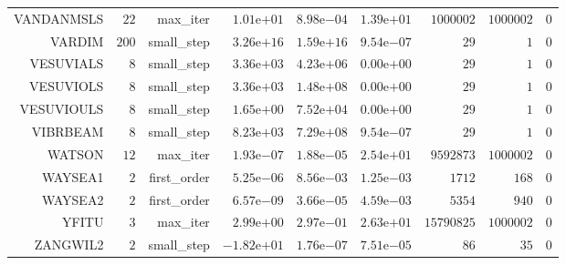 \begin{longtable}{rrrrrrrrr}
VANDANMSLS & \(    22\) & max\_iter & \( 1.01\)e\(+01\) & \( 8.98\)e\(-04\) & \( 1.39\)e\(+01\) & \(1000002\) & \(1000002\) & \(     0\) \\
VARDIM & \(   200\) & small\_step & \( 3.26\)e\(+16\) & \( 1.59\)e\(+16\) & \( 9.54\)e\(-07\) & \(    29\) & \(     1\) & \(     0\) \\
VESUVIALS & \(     8\) & small\_step & \( 3.36\)e\(+03\) & \( 4.23\)e\(+06\) & \( 0.00\)e\(+00\) & \(    29\) & \(     1\) & \(     0\) \\
VESUVIOLS & \(     8\) & small\_step & \( 3.36\)e\(+03\) & \( 1.48\)e\(+08\) & \( 0.00\)e\(+00\) & \(    29\) & \(     1\) & \(     0\) \\
VESUVIOULS & \(     8\) & small\_step & \( 1.65\)e\(+00\) & \( 7.52\)e\(+04\) & \( 0.00\)e\(+00\) & \(    29\) & \(     1\) & \(     0\) \\
VIBRBEAM & \(     8\) & small\_step & \( 8.23\)e\(+03\) & \( 7.29\)e\(+08\) & \( 9.54\)e\(-07\) & \(    29\) & \(     1\) & \(     0\) \\
WATSON & \(    12\) & max\_iter & \( 1.93\)e\(-07\) & \( 1.88\)e\(-05\) & \( 2.54\)e\(+01\) & \(9592873\) & \(1000002\) & \(     0\) \\
WAYSEA1 & \(     2\) & first\_order & \( 5.25\)e\(-06\) & \( 8.56\)e\(-03\) & \( 1.25\)e\(-03\) & \(  1712\) & \(   168\) & \(     0\) \\
WAYSEA2 & \(     2\) & first\_order & \( 6.57\)e\(-09\) & \( 3.66\)e\(-05\) & \( 4.59\)e\(-03\) & \(  5354\) & \(   940\) & \(     0\) \\
YFITU & \(     3\) & max\_iter & \( 2.99\)e\(+00\) & \( 2.97\)e\(-01\) & \( 2.63\)e\(+01\) & \(15790825\) & \(1000002\) & \(     0\) \\
ZANGWIL2 & \(     2\) & small\_step & \(-1.82\)e\(+01\) & \( 1.76\)e\(-07\) & \( 7.51\)e\(-05\) & \(    86\) & \(    35\) & \(     0\) \\\hline
\end{longtable}
